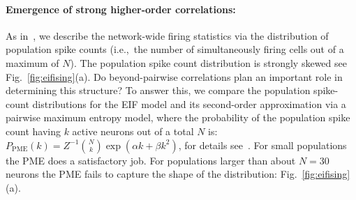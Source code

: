 \documentclass[%
 reprint,
 twocolumn,
 amsmath,amssymb,
 aps,
floatfix,
]{revtex4}
\begin{document}
\paragraph*{Emergence of strong higher-order correlations:} As in~\cite{Macke,Barreiro,Panzeri,Amarietal03}, we describe the network-wide firing statistics via the distribution of population spike counts (i.e.,~the number of simultaneously firing cells out of a maximum of $N$). The population spike count distribution is strongly skewed see Fig.~\ref{fig:eifising}(a). Do beyond-pairwise correlations plan an important role in determining this structure? To answer this, we compare the population spike-count distributions for the EIF model and its second-order approximation via a pairwise maximum entropy model, where the probability of the population spike count having $k$ active neurons out of a total $N$ is: $P_{\text{PME}}(k) = Z^{-1} \binom{N}{k}\exp{(\alpha k + \beta k^2)}$, for details see~\cite{Macke2011}. For small populations the PME does a satisfactory job. For populations larger than about $N=30$ neurons the PME fails to capture the shape of the distribution: Fig.~\ref{fig:eifising}(a). 
\end{document}
